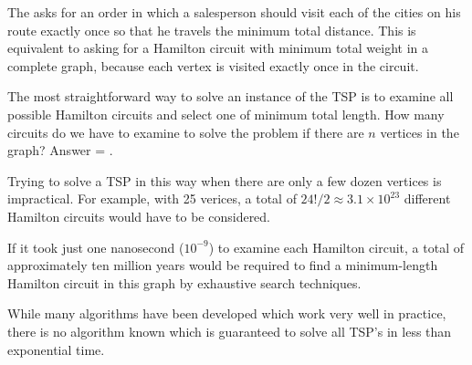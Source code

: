 \documentclass[aspectratio=169]{beamer}
\begin{document}
\begin{frame}[plain]{ }

The  
 asks for an order in which a salesperson should visit each of the
cities on his route exactly once so that he travels the minimum total distance.
This is equivalent to
asking for a Hamilton circuit with minimum total weight 
in a complete graph, because each
vertex is visited exactly once in the circuit. 

\medskip

The most straightforward way to solve an instance of the TSP is
to examine all possible Hamilton circuits and select one of minimum total length.
How many circuits do we have to examine to solve the problem 
if there are $n$ vertices in the graph? 
Answer =  .
\medskip

Trying to solve a TSP in this way
 when there are only a few dozen vertices is impractical.
For example, with 25 verices, a total of $24!/2 \approx 3.1\times 10^{23}$
different Hamilton circuits would have to be considered.
\medskip

If it took just one nanosecond ($10^{-9}$) to examine each Hamilton
circuit, a total of approximately ten million years would be required 
to find a minimum-length
Hamilton circuit in this graph by exhaustive search techniques.


\medskip
While many algorithms have been developed which work very well
in practice, there is no algorithm known which is guaranteed to solve 
all TSP’s in less than exponential
time.


\end{frame}

 
\end{document}
